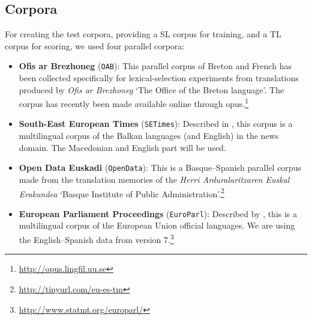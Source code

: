 \documentclass[11pt]{article}
\begin{document}
\subsection{Corpora}
\label{sec:eval-corpus}

For creating the test corpora, providing a SL corpus for training, and
a TL corpus for scoring, we used four parallel corpora:
\begin{itemize}
\addtolength{\itemsep}{-0.10in}
\item \textbf{Ofis ar Brezhoneg} (\texttt{OAB}): This parallel corpus
  of Breton and French has been collected specifically for
  lexical-selection experiments from translations produced by
  \emph{Ofis ar Brezhoneg} `The Office of the Breton
  language'. %
The corpus has recently been made available online through {\sc opus}.\footnote{\url{http://opus.lingfil.uu.se}}
\item \textbf{South-East European Times} (\texttt{SETimes}): Described
  in \cite{tyers10}, this corpus is a multilingual corpus of the
  Balkan languages (and English) in the news domain. The Macedonian and English
  part will be used.%
\item \textbf{Open Data Euskadi} (\texttt{OpenData}): This is a
  Basque--Spanish parallel corpus made from the translation
  memories of the \emph{Herri Arduralaritzaren Euskal Erakundea}
  `Basque Institute of Public
  Administration'.\footnote{\url{http://tinyurl.com/eu-es-tm}}
\item \textbf{European Parliament Proceedings} (\texttt{EuroParl}):
  Described by \cite{koehn05a}, this is a multilingual corpus of the
  European Union official languages. We are using the English--Spanish
  data from version 7.\footnote{\url{http://www.statmt.org/europarl/}}
\end{itemize}
\end{document}
